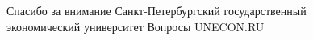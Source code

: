 \SPBGContactsSlide
  {Спасибо за внимание}
  {Санкт-Петербургский государственный\\экономический университет}
  {Вопросы}
  {}
  {UNECON.RU}
